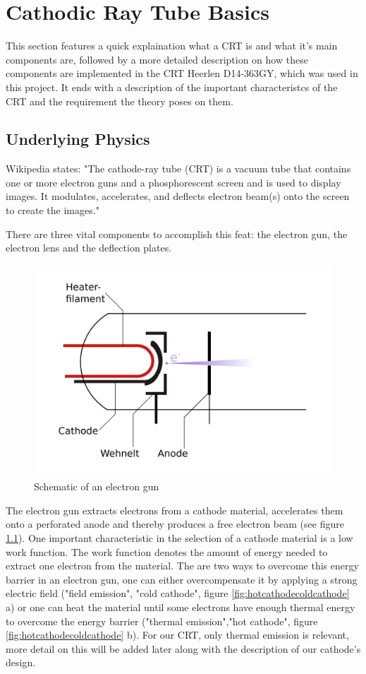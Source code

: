 
\chapter{Cathodic Ray Tube Basics}

This section features a quick explaination what a CRT is and what it's main components are, followed by a more detailed description on how these components are implemented in the CRT Heerlen D14-363GY, which was used in this project. It ends with a description of the important characteristcs of the CRT and the requirement the theory poses on them.

\section{Underlying Physics}

Wikipedia states: "The cathode-ray tube (CRT) is a vacuum tube that contains one or more electron guns and a phosphorescent screen and is used to display images. It modulates, accelerates, and deflects electron beam(s) onto the screen to create the images."

There are three vital components to accomplish this feat: the electron gun, the electron lens and the deflection plates.

\begin{figure}
	\centering
	\includegraphics[width=0.7\linewidth]{Chapters/CRT-Basics/electron_gun}
	\caption{Schematic of an electron gun}
	\label{fig:electrongun}
\end{figure}


The electron gun extracts electrons from a cathode material, accelerates them onto a perforated anode and thereby produces a free electron beam (see figure \ref{fig:electrongun}). One important characteristic in the selection of a cathode material is a low work function. The work function denotes the amount of energy needed to extract one electron from the material. The are two ways to overcome this energy barrier in an electron gun, one can either overcompensate it by applying a strong electric field ("field emission", "cold cathode", figure \ref{fig:hotcathodecoldcathode} a) or one can heat the material until some electrons have enough thermal energy to overcome the energy barrier ("thermal emission","hot cathode", figure \ref{fig:hotcathodecoldcathode} b). For our CRT, only thermal emission is relevant, more detail on this will be added later along with the description of our cathode's design. 

